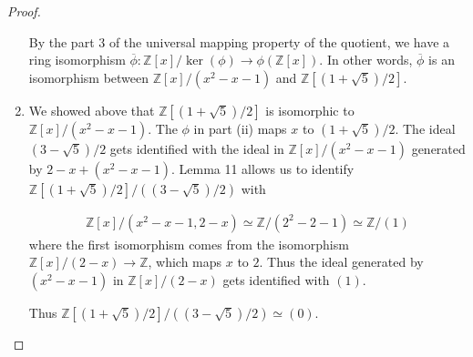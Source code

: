 \documentclass[12pt, psamsfonts]{amsart}
\theoremstyle{definition}
\theoremstyle{remark}
\numberwithin{equation}{section}
\begin{document}
\begin{proof}
\begin{enumerate}
      By the part 3 of the universal mapping property of the quotient, we have a ring isomorphism $\overline{\phi}: \mathbb{Z}[x]/\ker(\phi) \rightarrow \phi(\mathbb{Z}[x])$.
      In other words, $\overline{\phi}$ is an isomorphism between $\mathbb{Z}[x]/(x^2 - x- 1)$ and $\mathbb{Z}[(1 + \sqrt{5})/2]$.
    \item
      We showed above that $\mathbb{Z}[(1 + \sqrt{5})/2]$ is isomorphic to $\mathbb{Z}[x]/(x^2 - x - 1)$.
      The $\phi$ in part (ii)  maps $x$ to $(1 + \sqrt{5}) / 2$.
      The ideal $(3 - \sqrt{5}) / 2$ gets identified with the ideal in $\mathbb{Z}[x]/(x^2 - x - 1)$ generated by $2 - x + (x^2 - x - 1)$.
      Lemma 11 allows us to identify $\mathbb{Z}[(1 + \sqrt{5})/2]/((3 - \sqrt{5})/2)$ with

      \begin{align*}
        \mathbb{Z}[x]/(x^2 - x - 1, 2 - x) \simeq \mathbb{Z}/(2^2 - 2 - 1) \simeq \mathbb{Z}/(1)
      \end{align*}
      where the first isomorphism comes from the isomorphism $\mathbb{Z}[x] / (2 - x) \rightarrow \mathbb{Z}$, which maps $x$ to $2$.
      Thus the ideal generated by $(x^2 - x - 1)$ in $\mathbb{Z}[x]/(2 - x)$ gets identified with $(1)$.

      Thus $\mathbb{Z}[(1 + \sqrt{5})/2]/((3 - \sqrt{5})/2) \simeq (0)$.
  \end{enumerate}
\end{proof}
\end{document}
